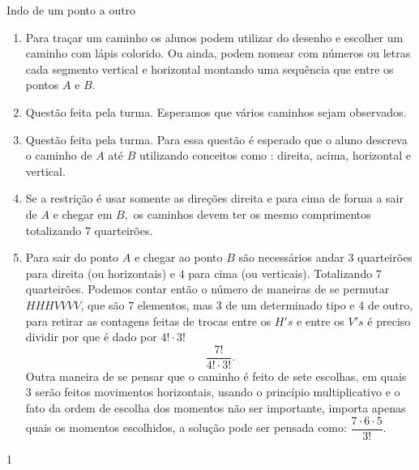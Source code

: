 \begin{answer}{Indo de um ponto a outro}
{
\begin{enumerate}
\item Para traçar um caminho  os alunos podem  utilizar do desenho e escolher um caminho com lápis colorido. Ou ainda, podem nomear com números ou letras cada segmento vertical e horizontal montando uma sequência que entre os pontos $A$ e $B.$

\item Questão feita pela turma. Esperamos que vários caminhos sejam observados.

\item Questão feita pela turma. Para essa questão é esperado que o aluno descreva o caminho de $A$ até $B$ utilizando conceitos como : direita, acima, horizontal e vertical. 


\item Se a restrição é usar somente as direções direita e para cima de forma a sair de $A$ e chegar em $B,$ os caminhos devem ter os mesmo comprimentos totalizando $7$ quarteirões. 

\item Para sair do ponto $A$ e chegar ao ponto $B$ são necessários andar $3$ quarteirões para direita (ou horizontais) e $4$ para cima (ou verticais). Totalizando $7$ quarteirões. Podemos contar então o número de maneiras de se permutar $HHHVVVV$, que são $7$ elementos, mas $3$ de um determinado tipo e $4$ de outro, para retirar as contagens feitas de trocas entre os $H's$ e entre os $V's$ é preciso dividir por  que é dado por $4!\cdot3!$ $$\dfrac{7!}{4!\cdot3!}.$$  Outra maneira de se pensar que o caminho é feito de sete escolhas, em quais  $3$ serão feitos movimentos horizontais, usando o princípio multiplicativo e o fato da ordem de escolha dos momentos não ser importante, importa apenas quais os momentos escolhidos, a solução pode ser pensada como:
$\dfrac{7 \cdot 6 \cdot 5}{3!}.$
\end{enumerate}
}{1}
\end{answer}

